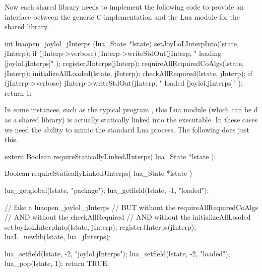 Now each shared library needs to implement the following code to provide 
an interface between the generic C-implementation and the Lua module for 
the shared library. 

\startCCode
int luaopen_joylol_jInterps (lua_State *lstate) {
  setJoyLoLInterpInto(lstate, jInterp);
  if (jInterp->verbose) {
    jInterp->writeStdOut(jInterp,
      "  loading [joylol.jInterps]\n"
    );
  }
  registerJInterps(jInterp);
  requireAllRequiredCoAlgs(lstate, jInterp);
  initializeAllLoaded(lstate, jInterp);
  checkAllRequired(lstate, jInterp);
  if (jInterp->verbose) {
    jInterp->writeStdOut(jInterp,
      "  loaded [joylol.jInterps]\n"
    );
  }
  return 1;
}
\stopCCode

In some instances, such as the typical  program 
, this Lua module (which can be d as a 
shared library) is actually statically linked into the executable. In 
these cases we need the ability to mimic the standard Lua  
process. The following  does just this. 

\startCHeader
extern Boolean requireStaticallyLinkedJInterps(
  lua_State *lstate
);
\stopCHeader

\startCCode
Boolean requireStaticallyLinkedJInterps(
  lua_State *lstate
) {
  lua_getglobal(lstate, "package");
  lua_getfield(lstate, -1, "loaded");
  
  // fake a luaopen_joylol_jInterps 
  // BUT without the requireAllRequiredCoAlgs
  // AND without the checkAllRequired
  // AND without the initializeAllLoaded
  setJoyLoLInterpInto(lstate, jInterp);
  registerJInterps(jInterp);
  luaL_newlib(lstate, lua_jInterps);
  
  lua_setfield(lstate, -2, "joylol.jInterps");
  lua_setfield(lstate, -2, "loaded");
  lua_pop(lstate, 1);
  return TRUE;
}
\stopCCode
